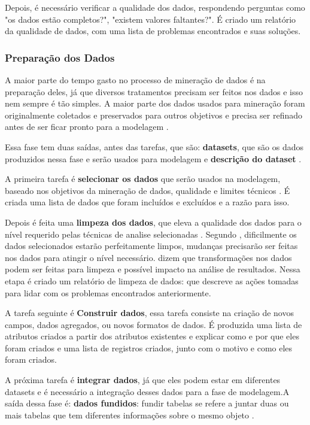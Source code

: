 Depois, é necessário verificar a qualidade dos dados, respondendo perguntas como "os dados estão completos?", "existem valores faltantes?". É criado um relatório da qualidade de dados, com uma lista de problemas encontrados e suas soluções.

\subsubsection{Preparação dos Dados}
A maior parte do tempo gasto no processo de mineração de dados é na preparação deles, já que diversos tratamentos precisam ser feitos nos dados e isso nem sempre é tão simples. A maior parte dos dados usados para mineração foram originalmente coletados e preservados para outros objetivos e precisa ser refinado antes de ser ficar pronto para a modelagem \citep{dmfd}.

Essa fase tem duas saídas, antes das tarefas, que são: \textbf{datasets}, que são os dados produzidos nessa fase e serão usados para modelagem e \textbf{descrição do dataset} \citep{crispmanual}.

A primeira tarefa é \textbf{selecionar os dados} que serão usados na modelagem, baseado nos objetivos da mineração de dados, qualidade e limites técnicos \citep{crispmanual}. É criada uma lista de dados que foram incluídos e excluídos e a razão para isso.

Depois é feita uma \textbf{limpeza dos dados}, que eleva a qualidade dos dados para o nível requerido pelas técnicas de analise selecionadas \citep{crispmanual}. Segundo , dificilmente os dados selecionados estarão perfeitamente limpos, mudanças precisarão ser feitas nos dados para atingir o nível necessário.  dizem que transformações nos dados podem ser feitas para limpeza e possível impacto na análise de resultados. Nessa etapa é criado um relatório de limpeza de dados: que descreve as ações tomadas para lidar com os problemas encontrados anteriormente.

A tarefa seguinte é \textbf{Construir dados}, essa tarefa consiste na criação de novos campos, dados agregados, ou novos formatos de dados. É produzida uma lista de atributos criados a partir dos atributos existentes e explicar como e por que eles foram criados e uma lista de registros criados, junto com o motivo e como eles foram criados.

A próxima tarefa é \textbf{integrar dados}, já que eles podem estar em diferentes datasets e é necessário a integração desses dados para a fase de modelagem.A saída dessa fase é: \textbf{dados fundidos}: fundir tabelas se refere a juntar duas ou mais tabelas que tem diferentes informações sobre o mesmo objeto \citep{crispmanual}. 

